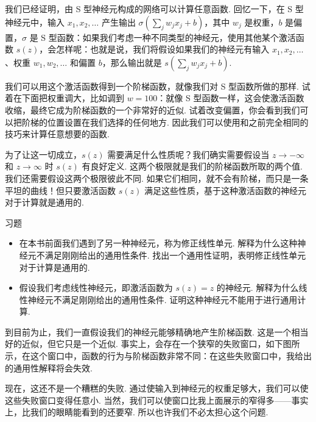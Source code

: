 我们已经证明，由 S 型神经元构成的网络可以计算任意函数. 回忆一下，在 S 型神经元中，输入 $x_1, x_2, \ldots$ 产生输出 $\sigma(\sum_j w_j x_j + b)$，其中 $w_j$ 是权重，$b$ 是偏置，$\sigma$ 是 S 型函数：如果我们考虑一种不同类型的神经元，使用其他某个激活函数 $s(z)$，会怎样呢：也就是说，我们将假设如果我们的神经元有输入 $x_1, x_2, \ldots$、权重 $w_1, w_2, \ldots$ 和偏置 $b$，那么输出就是 $s(\sum_j w_j x_j + b)$.

我们可以用这个激活函数得到一个阶梯函数，就像我们对 S 型函数所做的那样. 试着在下面把权重调大，比如调到 $w = 100$：就像 S 型函数一样，这会使激活函数收缩，最终它成为阶梯函数的一个非常好的近似. 试着改变偏置，你会看到我们可以把阶梯的位置设置在我们选择的任何地方. 因此我们可以使用和之前完全相同的技巧来计算任意想要的函数.

为了让这一切成立，$s(z)$ 需要满足什么性质呢？我们确实需要假设当 $z \rightarrow -\infty$ 和 $z \rightarrow \infty$ 时 $s(z)$ 有良好定义. 这两个极限就是我们的阶梯函数所取的两个值. 我们还需要假设这两个极限彼此不同. 如果它们相同，就不会有阶梯，而只是一条平坦的曲线！但只要激活函数 $s(z)$ 满足这些性质，基于这种激活函数的神经元对于计算就是通用的.

\begin{exerciseBox}{习题}

\begin{itemize}

\item 在本书前面我们遇到了另一种神经元，称为修正线性单元. 解释为什么这种神经元不满足刚刚给出的通用性条件. 找出一个通用性证明，表明修正线性单元对于计算是通用的.

\item 假设我们考虑线性神经元，即激活函数为 $s(z) = z$ 的神经元. 解释为什么线性神经元不满足刚刚给出的通用性条件. 证明这种神经元不能用于进行通用计算.

\end{itemize}

\end{exerciseBox}

到目前为止，我们一直假设我们的神经元能够精确地产生阶梯函数. 这是一个相当好的近似，但它只是一个近似. 事实上，会存在一个狭窄的失败窗口，如下图所示，在这个窗口中，函数的行为与阶梯函数非常不同：在这些失败窗口中，我给出的通用性解释将会失效.

现在，这还不是一个糟糕的失败. 通过使输入到神经元的权重足够大，我们可以使这些失败窗口变得任意小. 当然，我们可以使窗口比我上面展示的窄得多——事实上，比我们的眼睛能看到的还要窄. 所以也许我们不必太担心这个问题.

